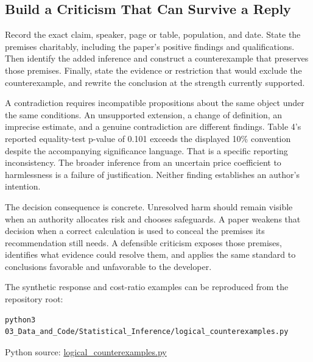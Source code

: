 \hypertarget{M09-build-a-criticism-that-can-survive-a-reply}{%
\subsection{Build a Criticism That Can Survive a
Reply}\label{M09-build-a-criticism-that-can-survive-a-reply}}

\noindent \noindent Record the exact claim, speaker, page or table, population,
and date. State the premises charitably, including the paper's positive
findings and qualifications. Then identify the added inference and
construct a counterexample that preserves those premises. Finally, state
the evidence or restriction that would exclude the counterexample, and
rewrite the conclusion at the strength currently supported.

A contradiction requires incompatible propositions about the same object
under the same conditions. An unsupported extension, a change of
definition, an imprecise estimate, and a genuine contradiction are
different findings. Table 4's reported equality-test p-value of 0.101
exceeds the displayed 10\% convention despite the accompanying
significance language. That is a specific reporting inconsistency. The
broader inference from an uncertain price coefficient to harmlessness is
a failure of justification. Neither finding establishes an author's
intention.

The decision consequence is concrete. Unresolved harm should remain
visible when an authority allocates risk and chooses safeguards. A paper
weakens that decision when a correct calculation is used to conceal the
premises its recommendation still needs. A defensible criticism exposes
those premises, identifies what evidence could resolve them, and applies
the same standard to conclusions favorable and unfavorable to the
developer.

The synthetic response and cost-ratio examples can be reproduced from
the repository root:

\begin{Verbatim}[breaklines,breakanywhere,fontsize=\small]
python3 03_Data_and_Code/Statistical_Inference/logical_counterexamples.py
\end{Verbatim}

\FloatBarrier
{}
Python source:
\href{../03_Data_and_Code/Statistical_Inference/logical_counterexamples.py}{logical\_counterexamples.py}

